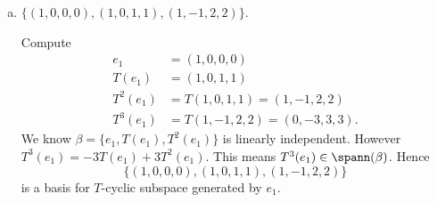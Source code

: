 \begin{Exercise}
\begin{enumerate}[(a)]
\item
\begin{answer}
$\{(1,0,0,0),(1,0,1,1),(1,-1,2,2)\}$.
\end{answer}
\begin{solution}
Compute
\begin{align*}
e_1 &= (1,0,0,0) \\
T(e_1) &= (1,0,1,1) \\
T^2(e_1) &= T(1,0,1,1) = (1,-1,2,2) \\
T^3(e_1) &= T(1,-1,2,2) = (0,-3,3,3).
\end{align*}
We know $\beta = \{e_1, T(e_1), T^2(e_1)\}$ is linearly independent. However $T^3(e_1) = -3T(e_1)+3T^2(e_1)$. This means $T^3(e_1)\in \spann(\beta)$. Hence
$$
\{(1,0,0,0),(1,0,1,1),(1,-1,2,2)\}
$$
is a basis for $T$-cyclic subspace generated by $e_1$.
\end{solution}
\end{enumerate}
\end{Exercise}